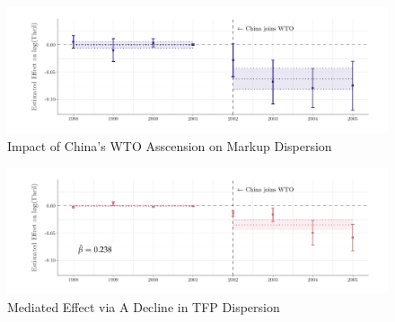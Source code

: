 \documentclass[aspectratio=169,t,11pt]{beamer}
\begin{document}
\begin{frame}
  \begin{figure}
    \caption{Impact of China's WTO Asscension on Markup Dispersion}
    \begin{adjustbox}{width=\textwidth}
      \includegraphics{../figures/trade-cce_est_interpolated.pdf}
    \end{adjustbox}
  \end{figure}
\end{frame}

\begin{frame}
  \begin{figure}
    \caption{Mediated Effect via A Decline in TFP Dispersion}
    \begin{adjustbox}{width=\textwidth}
      \includegraphics{../figures/trade-cce_mediated_est_interpolated.pdf}
    \end{adjustbox}
  \end{figure}
\end{frame}
\end{document}
